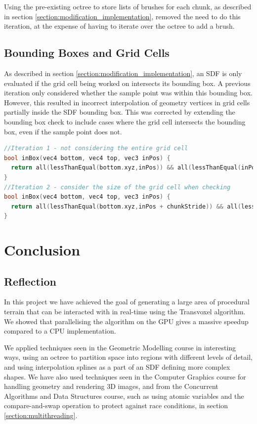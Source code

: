 \documentclass[11pt]{article}
\begin{document}
Using the pre-existing octree to store lists of brushes for each chunk, as described in section \ref{section:modification_implementation}, removed the need to do this iteration, at the expense of having to iterate over the octree to add a brush.

\subsection{Bounding Boxes and Grid Cells}
As described in section \ref{section:modification_implementation}, an SDF is only evaluated if the grid cell being worked on intersects its bounding box. A previous iteration only considered whether the sample point was within this bounding box. However, this resulted in incorrect interpolation of geometry vertices in grid cells partially inside the SDF bounding box. This was corrected by extending the bounding box check to include cases where the grid cell intersects the bounding box, even if the sample point does not.

\begin{lstlisting}[language=C++,label={bb_gc},caption={Different iterations of the SDF bounding box check.}]
//Iteration 1 - not considering the entire grid cell
bool inBox(vec4 bottom, vec4 top, vec3 inPos) {
  return all(lessThanEqual(bottom.xyz,inPos)) && all(lessThanEqual(inPos,top.xyz));
}
//Iteration 2 - consider the size of the grid cell when checking
bool inBox(vec4 bottom, vec4 top, vec3 inPos) {
  return all(lessThanEqual(bottom.xyz,inPos + chunkStride)) && all(lessThanEqual(inPos - chunkStride,top.xyz));
}
\end{lstlisting}
  
\section{Conclusion}
\subsection{Reflection}
In this project we have achieved the goal of generating a large area of procedural terrain that can be interacted with in real-time using the Transvoxel algorithm. We showed that parallelising the algorithm on the GPU gives a massive speedup compared to a CPU implementation.

We applied techniques seen in the Geometric Modelling course in interesting ways, using an octree to partition space into regions with different levels of detail, and using interpolation splines as a part of an SDF defining more complex shapes. 
We have also used techniques seen in the Computer Graphics course for handling geometry and rendering 3D images, and from the Concurrent Algorithms and Data Structures course, such as using atomic variables and the compare-and-swap operation to protect against race conditions, in section \ref{section:multithreading}.
\end{document}
